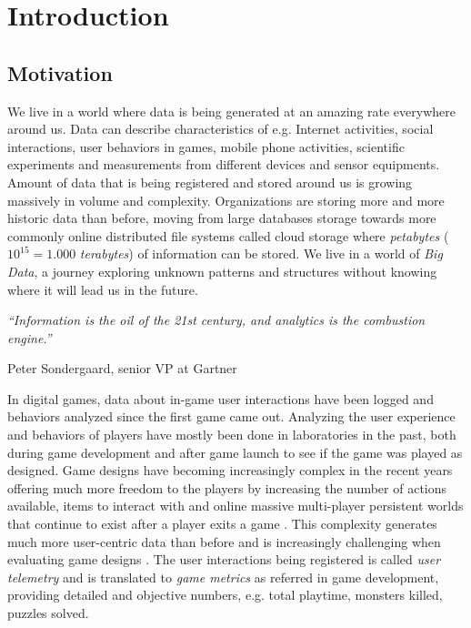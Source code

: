 
\chapter{Introduction} %
\label{Chapter1}

\section{Motivation}
We live in a world where data is being generated at an amazing rate everywhere around us. Data can describe characteristics of e.g. Internet activities, social interactions, user behaviors in games, mobile phone activities, scientific experiments and measurements from different devices and sensor equipments. Amount of data that is being registered and stored around us is growing massively in volume and complexity. Organizations are storing more and more historic data than before, moving from large databases storage towards more commonly online distributed file systems called cloud storage where \textit{petabytes} ($10^{15} = 1.000$ \textit{terabytes}) of information can be stored. We live in a world of \textit{Big Data}, a journey exploring unknown patterns and structures without knowing where it will lead us in the future. 

\null
\textit{``Information is the oil of the 21st century, and analytics is the combustion engine.''}

\begin{flushright}
Peter Sondergaard, senior VP at Gartner
\end{flushright}

In digital games, data about in-game user interactions have been logged and behaviors analyzed since the first game came out. Analyzing the user experience and behaviors of players have mostly been done in laboratories in the past, both during game development and after game launch to see if the game was played as designed. Game designs have becoming increasingly complex in the recent years offering much more freedom to the players by increasing the number of actions available, items to interact with and online massive multi-player persistent worlds that continue to exist after a player exits a game \citep{Kim:2008Tracking, Drachen:2011Evaluating}. This complexity generates much more user-centric data than before and is increasingly challenging when evaluating game designs \cite{Pagulayan:2002UserDesign, Seif:2013GameAnalytics}. The user interactions being registered is called \textit{user telemetry} and is translated to \textit{game metrics} as referred in game development, providing detailed and objective numbers, e.g. total playtime, monsters killed, puzzles solved.

